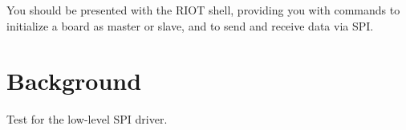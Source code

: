 You should be presented with the R\+I\+OT shell, providing you with commands to initialize a board as master or slave, and to send and receive data via S\+PI.

\section*{Background }

Test for the low-\/level S\+PI driver. 